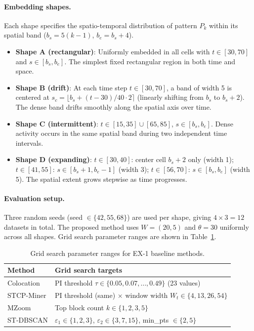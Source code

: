 \paragraph{Embedding shapes.}
Each shape specifies the spatio-temporal distribution of pattern $P_k$
within its spatial band
($b_s = 5(k-1)$, $b_e = b_s + 4$).

\begin{itemize}
\item \textbf{Shape A (rectangular)}:
  Uniformly embedded in all cells with
  $t \in [30,70]$ and $s \in [b_s, b_e]$.
  The simplest fixed rectangular region in both time and space.
\item \textbf{Shape B (drift)}:
  At each time step $t \in [30,70]$,
  a band of width 5 is centered at
  $s_c = \lfloor b_s + (t - 30) / 40 \cdot 2 \rceil$
  (linearly shifting from $b_s$ to $b_s{+}2$).
  The dense band drifts smoothly along the spatial axis over time.
\item \textbf{Shape C (intermittent)}:
  $t \in [15,35] \cup [65,85]$, $s \in [b_s, b_e]$.
  Dense activity occurs in the same spatial band
  during two independent time intervals.
\item \textbf{Shape D (expanding)}:
  $t \in [30,40]$: center cell $b_s{+}2$ only (width 1);
  $t \in [41,55]$: $s \in [b_s{+}1, b_e{-}1]$ (width 3);
  $t \in [56,70]$: $s \in [b_s, b_e]$ (width 5).
  The spatial extent grows stepwise as time progresses.
\end{itemize}

\paragraph{Evaluation setup.}
Three random seeds (seed $\in \{42,55,68\}$) are used per shape,
giving $4 \times 3 = 12$ datasets in total.
The proposed method uses $W = (20, 5)$ and $\theta = 30$
uniformly across all shapes.
Grid search parameter ranges are shown in Table~\ref{tab:params_ex3}.

\begin{table}[h]
\centering
\caption{Grid search parameter ranges for EX-1 baseline methods.}
\label{tab:params_ex3}
\small
\begin{tabular}{lp{}}
\toprule
Method & Grid search targets \\
\midrule
Colocation   & PI threshold $\tau \in \{0.05, 0.07, \ldots, 0.49\}$ (23 values) \\
STCP-Miner   & PI threshold (same) $\times$ window width $W_t \in \{4, 13, 26, 54\}$ \\
MZoom        & Top block count $k \in \{1, 2, 3, 5\}$ \\
ST-DBSCAN    & $\varepsilon_1 \in \{1,2,3\}$, $\varepsilon_2 \in \{3,7,15\}$, min\_pts $\in \{2,5\}$ \\
\bottomrule
\end{tabular}
\end{table}

